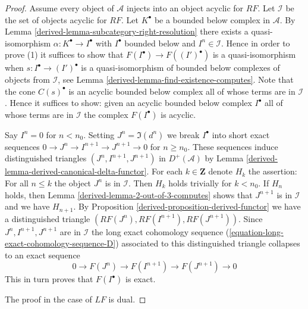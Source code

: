 \begin{proof}

Assume every object of $\mathcal{A}$ injects into an object acyclic
for $RF$. Let $\mathcal{I}$ be the set of objects acyclic for $RF$.
Let $K^\bullet$ be a bounded below complex in $\mathcal{A}$. By
Lemma \ref{derived-lemma-subcategory-right-resolution}
there exists a quasi-isomorphism $\alpha : K^\bullet \to I^\bullet$ with
$I^\bullet$ bounded below and $I^n \in \mathcal{I}$. Hence in order to
prove (1) it suffices to show that
$F(I^\bullet) \to F((I')^\bullet)$ is a quasi-isomorphism when
$s : I^\bullet \to (I')^\bullet$ is a quasi-isomorphism of bounded
below complexes of objects from $\mathcal{I}$, see
Lemma \ref{derived-lemma-find-existence-computes}.
Note that the cone $C(s)^\bullet$ is an acyclic bounded below complex
all of whose terms are in $\mathcal{I}$.
Hence it suffices to show: given an acyclic bounded below complex
$I^\bullet$ all of whose terms are in $\mathcal{I}$ the complex
$F(I^\bullet)$ is acyclic.

\medskip\noindent
Say $I^n = 0$ for $n < n_0$. Setting $J^n = \Im(d^n)$ we break
$I^\bullet$ into short exact sequences
$0 \to J^n \to I^{n + 1} \to J^{n + 1} \to 0$
for $n \geq n_0$. These sequences induce distinguished triangles
$(J^n, I^{n + 1}, J^{n + 1})$ in $D^+(\mathcal{A})$ by
Lemma \ref{derived-lemma-derived-canonical-delta-functor}.
For each $k \in \mathbf{Z}$ denote $H_k$ the assertion:
For all $n \leq k$ the object $J^n$ is in $\mathcal{I}$.
Then $H_k$ holds trivially for $k < n_0$. If $H_n$ holds,
then Lemma \ref{derived-lemma-2-out-of-3-computes} shows that
$J^{n + 1}$ is in $\mathcal{I}$ and we have $H_{n + 1}$.
By Proposition \ref{derived-proposition-derived-functor} we have a
distinguished triangle $(RF(J^n), RF(I^{n + 1}), RF(J^{n + 1}))$.
Since $J^n, I^{n + 1}, J^{n + 1}$ are in $\mathcal{I}$
the long exact cohomology sequence
(\ref{equation-long-exact-cohomology-sequence-D})
associated to this distinguished triangle collapses
to an exact sequence
$$
0 \to F(J^n) \to F(I^{n + 1}) \to F(J^{n + 1}) \to 0
$$
This in turn proves that $F(I^\bullet)$ is exact.

\medskip\noindent
The proof in the case of $LF$ is dual.
\end{proof}


